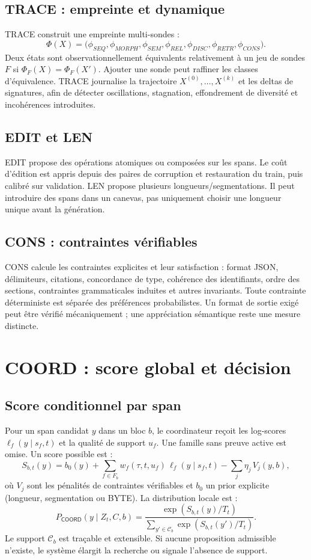 \documentclass[11pt,a4paper,oneside]{report}
\newcommand{\Coord}{\mathsf{COORD}}
\begin{document}
\section{TRACE : empreinte et dynamique}
TRACE construit une empreinte multi-sondes :
\[
\Phi(X)=\bigl(\phi_{SEQ},\phi_{MORPH},\phi_{SEM},\phi_{REL},\phi_{DISC},\phi_{RETR},\phi_{CONS}\bigr).
\]
Deux états sont observationnellement équivalents relativement à un jeu de sondes $F$ si $\Phi_F(X)=\Phi_F(X')$. Ajouter une sonde peut raffiner les classes d'équivalence. TRACE journalise la trajectoire $X^{(0)},\ldots,X^{(k)}$ et les deltas de signatures, afin de détecter oscillations, stagnation, effondrement de diversité et incohérences introduites.

\section{EDIT et LEN}
EDIT propose des opérations atomiques ou composées sur les spans. Le coût d'édition est appris depuis des paires de corruption et restauration du train, puis calibré sur validation. LEN propose plusieurs longueurs/segmentations. Il peut introduire des spans dans un canevas, pas uniquement choisir une longueur unique avant la génération.

\section{CONS : contraintes vérifiables}
CONS calcule les contraintes explicites et leur satisfaction : format JSON, délimiteurs, citations, concordance de type, cohérence des identifiants, ordre des sections, contraintes grammaticales induites et autres invariants. Toute contrainte déterministe est séparée des préférences probabilistes. Un format de sortie exigé peut être vérifié mécaniquement ; une appréciation sémantique reste une mesure distincte.

\chapter{COORD : score global et décision}
\section{Score conditionnel par span}
Pour un span candidat $y$ dans un bloc $b$, le coordinateur reçoit les log-scores $\ell_f(y\mid s_f,t)$ et la qualité de support $u_f$. Une famille sans preuve active est omise. Un score possible est :
\[
S_{b,t}(y)=b_{0}(y)+\sum_{f\in F_b}w_f(\tau,t,u_f)\,\ell_f(y\mid s_f,t)
-\sum_j\eta_j\,V_j(y,b),
\]
où $V_j$ sont les pénalités de contraintes vérifiables et $b_0$ un prior explicite (longueur, segmentation ou BYTE). La distribution locale est :
\[
P_{\Coord}(y\mid Z_t,C,b)=\frac{\exp(S_{b,t}(y)/T_t)}
{\sum_{y'\in\mathcal C_b}\exp(S_{b,t}(y')/T_t)}.
\]
Le support $\mathcal C_b$ est traçable et extensible. Si aucune proposition admissible n'existe, le système élargit la recherche ou signale l'absence de support.
\end{document}
